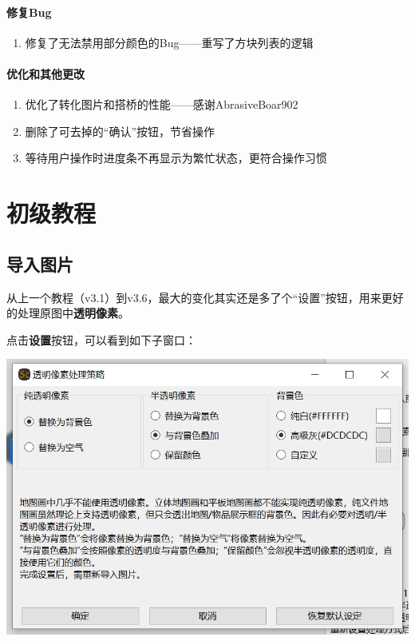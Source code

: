 \documentclass[UTF8]{ctexart}
\begin{document}
    \paragraph{修复Bug}
    \begin{enumerate}
        \item 修复了无法禁用部分颜色的Bug——重写了方块列表的逻辑 
    \end{enumerate}
    \paragraph{优化和其他更改}
    \begin{enumerate}        
        \item 优化了转化图片和搭桥的性能——感谢AbrasiveBoar902
        \item 删除了可去掉的“确认”按钮，节省操作
        \item 等待用户操作时进度条不再显示为繁忙状态，更符合操作习惯
    \end{enumerate}

    \pagebreak
    \section{初级教程}
    \subsection{导入图片}
    从上一个教程（v3.1）到v3.6，最大的变化其实还是多了个“设置”按钮，用来更好的处理原图中\textbf{透明像素}。
    
    点击\textbf{设置}按钮，可以看到如下子窗口：
    \begin{center}
        \includegraphics[width=15cm]{Img1_TPS.png}
    \end{center}
\end{document}
